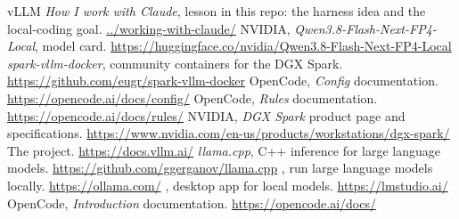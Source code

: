 \documentclass[11pt,a4paper]{article}
\begin{document}
\begin{thebibliography}{vLLM}
   \textit{How I work with Claude}, lesson in this repo: the harness idea and the local-coding goal. \url{../working-with-claude/}
   NVIDIA, \textit{Qwen3.8-Flash-Next-FP4-Local}, model card. \url{https://huggingface.co/nvidia/Qwen3.8-Flash-Next-FP4-Local}
   \textit{spark-vllm-docker}, community containers for the DGX Spark. \url{https://github.com/eugr/spark-vllm-docker}
   OpenCode, \textit{Config} documentation. \url{https://opencode.ai/docs/config/}
   OpenCode, \textit{Rules} documentation. \url{https://opencode.ai/docs/rules/}
   NVIDIA, \textit{DGX Spark} product page and specifications. \url{https://www.nvidia.com/en-us/products/workstations/dgx-spark/}
   The  project. \url{https://docs.vllm.ai/}
   \textit{llama.cpp}, C++ inference for large language models. \url{https://github.com/ggerganov/llama.cpp}
   , run large language models locally. \url{https://ollama.com/}
   , desktop app for local models. \url{https://lmstudio.ai/}
   OpenCode, \textit{Introduction} documentation. \url{https://opencode.ai/docs/}
\end{thebibliography}

\revisiontable
\end{document}
